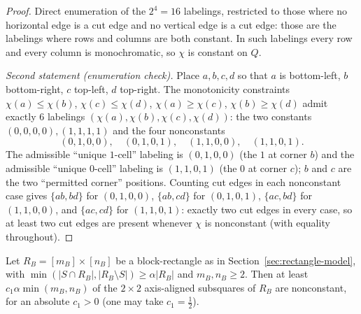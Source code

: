\begin{proof}
Direct enumeration of the $2^4=16$ labelings, restricted to those where
no horizontal edge is a cut edge and no vertical edge is a cut edge:
those are the labelings where rows and columns are both constant. In
such labelings every row and every column is monochromatic, so $\chi$
is constant on $Q$.

\emph{Second statement (enumeration check).}
Place $a,b,c,d$ so that $a$ is bottom-left, $b$ bottom-right, $c$
top-left, $d$ top-right. The monotonicity constraints
$\chi(a)\le\chi(b)$, $\chi(c)\le\chi(d)$, $\chi(a)\ge\chi(c)$,
$\chi(b)\ge\chi(d)$ admit exactly $6$ labelings
$(\chi(a),\chi(b),\chi(c),\chi(d))$: the two constants
$(0,0,0,0),(1,1,1,1)$ and the four nonconstants
\[
(0,1,0,0),\quad(0,1,0,1),\quad(1,1,0,0),\quad(1,1,0,1).
\]
The admissible ``unique $1$-cell'' labeling is $(0,1,0,0)$ (the $1$ at
corner $b$) and the admissible ``unique $0$-cell'' labeling is
$(1,1,0,1)$ (the $0$ at corner $c$); $b$ and $c$ are the two
``permitted corner'' positions. Counting cut edges in each nonconstant
case gives $\{ab,bd\}$ for $(0,1,0,0)$, $\{ab,cd\}$ for $(0,1,0,1)$,
$\{ac,bd\}$ for $(1,1,0,0)$, and $\{ac,cd\}$ for $(1,1,0,1)$: exactly
two cut edges in every case, so at least two cut edges are present
whenever $\chi$ is nonconstant (with equality throughout).
\end{proof}

\begin{lemma}
\label{lem:many-nonconst}
Let $R_B=[m_B]\times[n_B]$ be a block-rectangle as in
Section~\ref{sec:rectangle-model}, with
$\min(|S\cap R_B|,|R_B\setminus S|)\ge\alpha|R_B|$ and $m_B,n_B\ge 2$.
Then at least $c_1\alpha\min(m_B,n_B)$ of the $2\times2$ axis-aligned
subsquares of $R_B$ are nonconstant, for an absolute $c_1>0$ (one may
take $c_1=\tfrac12$).
\end{lemma}

